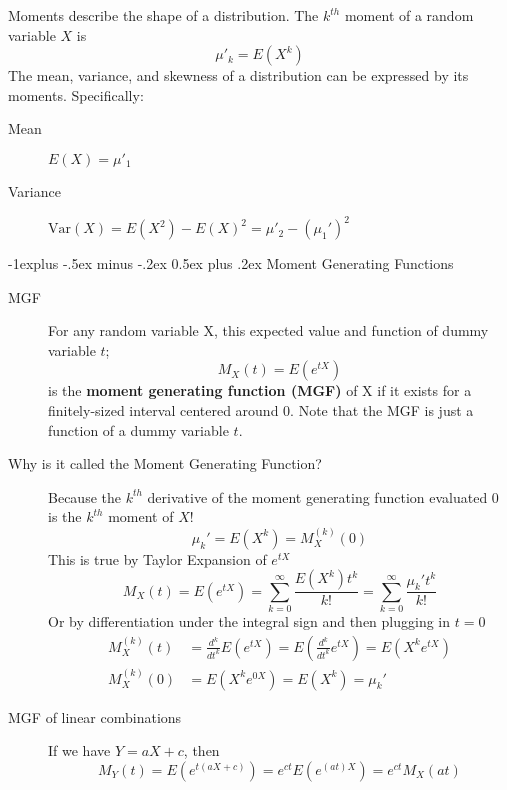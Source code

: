 \documentclass[10pt,landscape]{article}
\makeatletter
\newcommand{\var}{\textrm{Var}}
\renewcommand{\subsection}{\@startsection{subsection}{2}{0mm}%
                                {-1explus -.5ex minus -.2ex}%
                                {0.5ex plus .2ex}%
                                {\normalfont\normalsize\bfseries}}
\makeatother
\begin{document}
\begin{multicols}{3}
Moments describe the shape of a distribution. The $k^{th}$ moment of a random variable $X$ is
    \[\mu'_k = E(X^k)\]
The mean, variance, and skewness of a distribution can be expressed by its moments. Specifically:
    \begin{description}
        \item[Mean] $E(X) = \mu'_1 $
        \item[Variance] $\var(X) = E(X^2) - E(X)^2 = \mu'_2 - (\mu_1')^2$
    \end{description}

\subsection{Moment Generating Functions}

\begin{description}
    \item[MGF] For any random variable X, this expected value and function of dummy variable $t$;
        \[ M_X(t) = E(e^{tX}) \]
        is the \textbf{moment generating function (MGF)} of X if it exists for a finitely-sized interval centered around 0. Note that the MGF is just a function of a dummy variable $t$.
    \item[Why is it called the Moment Generating Function?] Because the $k^{th}$ derivative of the moment generating function evaluated 0 is the $k^{th}$ moment of $X$!
    \[\mu_k' = E(X^k) = M_X^{(k)}(0)\]
    This is true by Taylor Expansion of $e^{tX}$
    \[M_X(t) = E(e^{tX}) = \sum_{k=0}^\infty \frac{E(X^k)t^k}{k!} = \sum_{k=0}^\infty \frac{\mu_k't^k}{k!} \]
    Or by differentiation under the integral sign and then plugging in $t=0$
    \begin{align*}
        M_X^{(k)}(t) &= \frac{d^k}{dt^k}E(e^{tX}) = E\left(\frac{d^k}{dt^k}e^{tX}\right) = E(X^ke^{tX}) \\
        M_X^{(k)}(0) &= E(X^ke^{0X}) = E(X^k) = \mu_k'
    \end{align*}
    
    \item[MGF of linear combinations] If we have $Y = aX + c$, then
        \[M_Y(t) = E(e^{t(aX + c)}) =  e^{ct}E(e^{(at)X}) = e^{ct}M_X(at)\]
        

\end{description}
\end{multicols}
\end{document}
